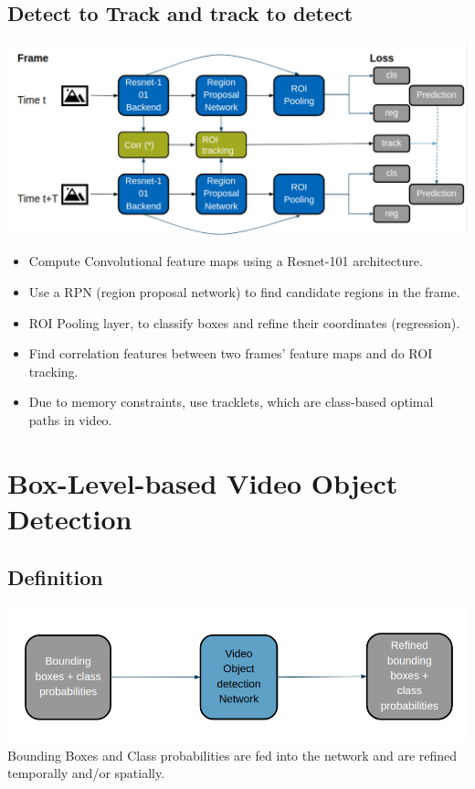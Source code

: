 \documentclass[conference]{IEEEtran}
\begin{document}
\subsection{Detect to Track and track to detect}
\includegraphics[width=\columnwidth]{D&T-architecture}
\begin{itemize}
	\item Compute Convolutional feature maps using a Resnet-101 architecture.
	\item Use a RPN (region proposal network) to find candidate regions in the frame.
	\item ROI Pooling layer, to classify boxes and refine their coordinates (regression).
	\item Find correlation features between two frames’ feature maps and do ROI tracking.
	\item Due to memory constraints, use tracklets, which are class-based optimal paths in video.

\end{itemize}

\section{Box-Level-based Video Object Detection}

\subsection{Definition}
\includegraphics[width=\columnwidth]{box-level-basic}
Bounding Boxes and Class probabilities are fed into the network and are refined temporally and/or spatially.
\end{document}
